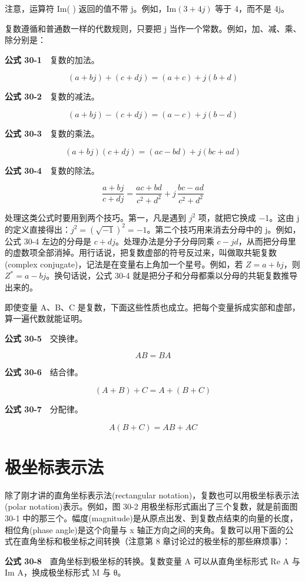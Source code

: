 注意，运算符 Im( ) 返回的值不带 j。例如，\(\mathrm{Im}(3+4j)\) 等于
4，而不是 4j。

复数遵循和普通数一样的代数规则，只要把 j
当作一个常数。例如，加、减、乘、除分别是：

\textbf{公式 30-1}　复数的加法。

\[(a+bj) + (c+dj) = (a+c) + j(b+d)\]

\textbf{公式 30-2}　复数的减法。

\[(a+bj) - (c+dj) = (a-c) + j(b-d)\]

\textbf{公式 30-3}　复数的乘法。

\[(a+bj)(c+dj) = (ac-bd) + j(bc+ad)\]

\textbf{公式 30-4}　复数的除法。

\[\frac{a+bj}{c+dj} = \frac{ac+bd}{c^2+d^2} + j\,\frac{bc-ad}{c^2+d^2}\]

处理这类公式时要用到两个技巧。第一，凡是遇到 \(j^2\) 项，就把它换成
−1。这由 j
的定义直接得出：\(j^2 = (\sqrt{-1})^2 = -1\)。第二个技巧用来消去分母中的
j。例如，公式 30-4 左边的分母是 \(c+dj\)。处理办法是分子分母同乘
\(c-jd\)，从而把分母里的虚数项全部消掉。用行话说，把复数虚部的符号反过来，叫做取共轭复数(complex
conjugate)，记法是在变量右上角加一个星号。例如，若 \(Z = a+bj\)，则
\(Z^* = a-bj\)。换句话说，公式 30-4
就是把分子和分母都乘以分母的共轭复数推导出来的。

即使变量 A、B、C
是复数，下面这些性质也成立。把每个变量拆成实部和虚部，算一遍代数就能证明。

\textbf{公式 30-5}　交换律。

\[AB = BA\]

\textbf{公式 30-6}　结合律。

\[(A+B)+C = A+(B+C)\]

\textbf{公式 30-7}　分配律。

\[A(B+C) = AB + AC\]

\section{极坐标表示法}

除了刚才讲的直角坐标表示法(rectangular
notation)，复数也可以用极坐标表示法(polar notation)表示。例如，图 30-2
用极坐标形式画出了三个复数，就是前面图 30-1
中的那三个。幅度(magnitude)是从原点出发、到复数点结束的向量的长度，相位角(phase
angle)是这个向量与 x
轴正方向之间的夹角。复数可以用下面的公式在直角坐标和极坐标之间转换（注意第
8 章讨论过的极坐标的那些麻烦事）：

\textbf{公式 30-8}　直角坐标到极坐标的转换。复数变量 A
可以从直角坐标形式 Re A 与 Im A，换成极坐标形式 M 与 θ。

